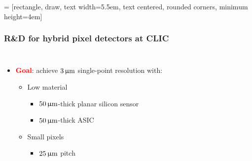 = [rectangle, draw, text width=5.5em, text centered, rounded corners, minimum
height=4em]
\usetikzlibrary{backgrounds,fit,decorations.pathreplacing} 

\begin{frame}
  \frametitle{R\&D for hybrid pixel detectors at CLIC}

  \begin{columns}
    \begin{itemize}
    \item \textcolor{Red}{\textbf{Goal}}: achieve $3\,\upmu\mathrm{m}$ single-point resolution with:
      \begin{itemize}
      \item Low material
        \begin{itemize}
        \item $50\,\upmu\mathrm{m}$-thick planar silicon sensor
        \item $50\,\upmu\mathrm{m}$-thick ASIC
        \end{itemize} 
      \item Small pixels
        \begin{itemize}
        \item $25\,\upmu\mathrm{m}$ pitch
        \end{itemize}
      \end{itemize}
    \end{itemize}

    \begin{adjustbox}{max totalsize={.9\textwidth}{.9\textheight},center}
\end{adjustbox}
\end{columns}
\end{frame}

